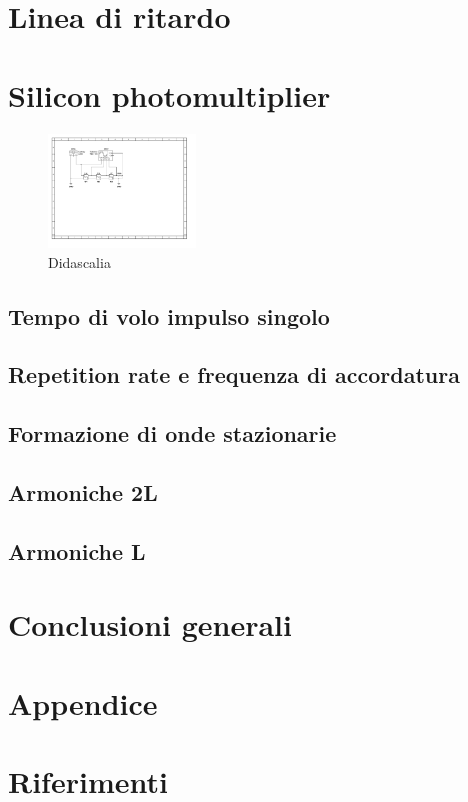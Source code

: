 \documentclass[journal]{IEEEtran}
\begin{document}
\section{Linea di ritardo} %

\section{Silicon photomultiplier} %

\begin{figure}[H]%
\begin {center}
\includegraphics[width=0.35\textwidth]{sch-simulations/output/Transmission line.pdf}
\caption{Didascalia}
\label{fig:oscilloscope}
\end {center}
\end{figure}

\subsection{Tempo di volo impulso singolo}

\subsection{Repetition rate e frequenza di accordatura}

\subsection{Formazione di onde stazionarie}

\subsection{Armoniche 2L}

\subsection{Armoniche L}

\section{Conclusioni generali} %


\section{Appendice}


\section{Riferimenti}

\printbibliography
\end{document}
